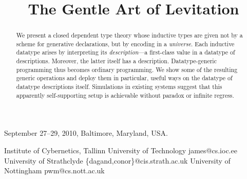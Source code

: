 \documentclass[authoryear]{sigplanconf}
\begin{document}
\MonochromeEpigram

 {September 27--29, 2010, Baltimore, Maryland, USA.}






\title{The Gentle Art of Levitation}


           {Institute of Cybernetics, Tallinn University of Technology}
           {james@cs.ioc.ee}
           {University of Strathclyde}
           {\{dagand,conor\}@cis.strath.ac.uk}
           {University of Nottingham}
           {pwm@cs.nott.ac.uk}


\maketitle




\begin{abstract}
  We present a closed dependent type theory whose inductive types
  are given not by a scheme for generative declarations,
  but by encoding in a \emph{universe}. Each inductive datatype arises
  by interpreting its \emph{description}---a
  first-class value in a datatype of descriptions. Moreover, the
  latter itself has a description. Datatype-generic programming thus
  becomes ordinary programming. We show some of the resulting generic
  operations and deploy them in particular, useful ways on the
  datatype of datatype descriptions itself. Simulations in existing
  systems suggest that this
  apparently self-supporting setup is achievable without paradox or
  infinite regress.
\end{abstract}

\end{document}

